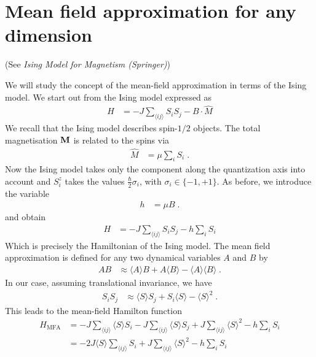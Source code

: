 \section{Mean field approximation for any dimension}

(See {\em Ising Model for Magnetism (Springer)})

We will study the concept of the mean-field approximation in terms of the Ising model. 
We start out from  the Ising model expressed as
%
\begin{align*}
H &= - J \sum_{\langle ij\rangle} S_{i}S_{j} - 
B \cdot \hat M
\end{align*}
%
We recall that the Ising model describes spin-$1/2$ objects. 
The total magnetisation $\mathbf M$ is related to the spins
via 
%
\begin{align*}
\hat  M &=  \mu \sum_{i}
S_{i}\;.
\end{align*}
%
Now the Ising model takes only the component along the quantization axis into account and $S_{i}^{z}$ takes the values $\frac{\hbar}{2} \sigma_{i}$, with 
	$\sigma_{i}\in \{-1,+1\}$. 
%
As before, we introduce the  variable
%
\begin{align*}
h &= \mu  B\;.
\end{align*}
%
and obtain
\begin{align*}
H &= -J \sum_{\langle ij\rangle} S_{i}S_{j} - 
h \sum_{i} S_{i}
\end{align*}
Which is precisely the Hamiltonian of the Ising model. The mean field approximation is defined for any two dynamical variables $A$ and $B$
by
%
\begin{align*}
A B &\approx \langle A  \rangle B + A \langle B \rangle
-\langle A \rangle\langle B  \rangle\;.
\end{align*}
%
In our case, assuming translational invariance, we have
\begin{align*}
S_{i} S_{j}&\approx \langle S \rangle S_{j} + S_{i} \langle S \rangle
-\langle S \rangle^{2}\;.
\end{align*}
This leads to  the mean-field Hamilton function
%
\begin{align*}
H_\text{MFA} &= - J  \sum_{\langle ij\rangle}  \langle S \rangle S_{i}
- J  \sum_{\langle ij\rangle}  \langle S \rangle S_{j}
+J \sum_{\langle ij\rangle}  \langle S \rangle^{2}
  - h
\sum_{i} S_{i} \\
&= - 2J    \langle S \rangle \sum_{\langle ij\rangle} S_{i}
+J \sum_{\langle ij\rangle}  \langle S \rangle^{2}
  - h \sum_{i} S_{i} \\
\end{align*}
